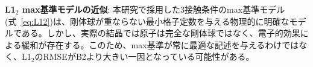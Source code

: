\documentclass[a4paper,10pt,5p]{elsarticle}
\begin{document}
\textbf{L1$_2$ max基準モデルの近似}: 本研究で採用した3接触条件のmax基準モデル(式~\ref{eq:L12})は、剛体球が重ならない最小格子定数を与える物理的に明確なモデルである。しかし、実際の結晶では原子は完全な剛体球ではなく、電子的効果による緩和が存在する。このため、max基準が常に最適な記述を与えるわけではなく、L1$_2$のRMSEがB2より大きい一因となっている可能性がある。







\end{document}
